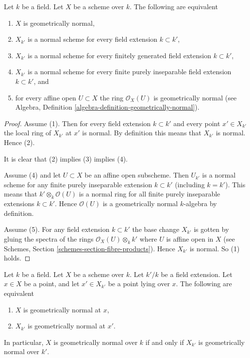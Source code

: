 \begin{lemma}
\label{lemma-geometrically-normal}
Let $k$ be a field.
Let $X$ be a scheme over $k$.
The following are equivalent
\begin{enumerate}
\item $X$ is geometrically normal,
\item $X_{k'}$ is a normal scheme for every field extension $k \subset k'$,
\item $X_{k'}$ is a normal scheme for every finitely generated field
extension $k \subset k'$,
\item $X_{k'}$ is a normal scheme for every finite purely inseparable
field extension $k \subset k'$, and
\item for every affine open $U \subset X$ the ring $\mathcal{O}_X(U)$
is geometrically normal (see
Algebra, Definition \ref{algebra-definition-geometrically-normal}).
\end{enumerate}
\end{lemma}

\begin{proof}
Assume (1). Then for every field extension $k \subset k'$ and
every point $x' \in X_{k'}$ the local ring of $X_{k'}$ at $x'$
is normal. By definition this means that $X_{k'}$ is normal.
Hence (2).

\medskip\noindent
It is clear that (2) implies (3) implies (4).

\medskip\noindent
Assume (4) and let $U \subset X$ be an affine open subscheme.
Then $U_{k'}$ is a normal scheme for any finite purely inseparable
extension $k \subset k'$ (including $k = k'$). This means that
$k' \otimes_k \mathcal{O}(U)$ is a normal ring for all
finite purely inseparable extensions $k \subset k'$. Hence
$\mathcal{O}(U)$ is a geometrically normal $k$-algebra by definition.

\medskip\noindent
Assume (5). For any field extension $k \subset k'$ the base
change $X_{k'}$ is gotten by gluing the spectra of the
rings $\mathcal{O}_X(U) \otimes_k k'$ where $U$ is affine open
in $X$ (see Schemes, Section \ref{schemes-section-fibre-products}).
Hence $X_{k'}$ is normal. So (1) holds.
\end{proof}

\begin{lemma}
\label{lemma-geometrically-normal-upstairs}
Let $k$ be a field.
Let $X$ be a scheme over $k$.
Let $k'/k$ be a field extension.
Let $x \in X$ be a point, and let $x' \in X_{k'}$ be a point lying over $x$.
The following are equivalent
\begin{enumerate}
\item $X$ is geometrically normal at $x$,
\item $X_{k'}$ is geometrically normal at $x'$.
\end{enumerate}
In particular, $X$ is geometrically normal over $k$ if and only if
$X_{k'}$ is geometrically normal over $k'$.
\end{lemma}

